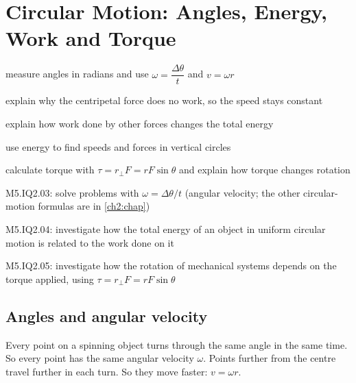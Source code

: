 \chapter{Circular Motion: Angles, Energy, Work and Torque}\label{ch3:chap}


\begin{goals}
  \item measure angles in radians and use $\omega = \dfrac{\Delta\theta}{t}$ and $v = \omega r$
  \item explain why the centripetal force does no work, so the speed stays constant
  \item explain how work done by other forces changes the total energy
  \item use energy to find speeds and forces in vertical circles
  \item calculate torque with $\tau = r_\perp F = rF\sin\theta$ and explain how torque changes rotation
\end{goals}

\begin{syllabus}
  \item M5.IQ2.03: solve problems with $\omega = \Delta\theta/t$ (angular velocity; the other
        circular-motion formulas are in \cref{ch2:chap})
  \item M5.IQ2.04: investigate how the total energy of an object in uniform circular motion is
        related to the work done on it
  \item M5.IQ2.05: investigate how the rotation of mechanical systems depends on the torque
        applied, using $\tau = r_\perp F = rF\sin\theta$
\end{syllabus}

\section{Angles and angular velocity}\label{ch3:sec:omega}

\begin{bigidea}
Every point on a spinning object turns through the same angle in the same time. So every
point has the same angular velocity $\omega$. Points further from the centre travel further
in each turn. So they move faster: $v = \omega r$.
\end{bigidea}

